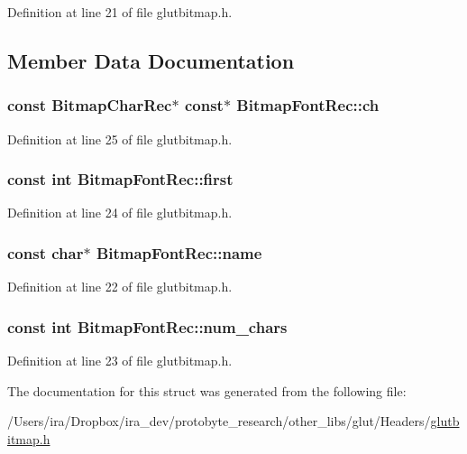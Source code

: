Definition at line 21 of file glutbitmap.\-h.



\subsection{Member Data Documentation}
\hypertarget{struct_bitmap_font_rec_a5dc1989a9be5be061a6fe71affff15be}{
\subsubsection[{ch}]{\setlength{\rightskip}{0pt plus 5cm}const {\bf Bitmap\-Char\-Rec}$\ast$ const$\ast$ Bitmap\-Font\-Rec\-::ch}}\label{struct_bitmap_font_rec_a5dc1989a9be5be061a6fe71affff15be}


Definition at line 25 of file glutbitmap.\-h.

\hypertarget{struct_bitmap_font_rec_ae3fa065bd6cb89438656029968f38a37}{
\subsubsection[{first}]{\setlength{\rightskip}{0pt plus 5cm}const int Bitmap\-Font\-Rec\-::first}}\label{struct_bitmap_font_rec_ae3fa065bd6cb89438656029968f38a37}


Definition at line 24 of file glutbitmap.\-h.

\hypertarget{struct_bitmap_font_rec_ad70b2bdb7beb381ac3e6aaab7742a6cf}{
\subsubsection[{name}]{\setlength{\rightskip}{0pt plus 5cm}const char$\ast$ Bitmap\-Font\-Rec\-::name}}\label{struct_bitmap_font_rec_ad70b2bdb7beb381ac3e6aaab7742a6cf}


Definition at line 22 of file glutbitmap.\-h.

\hypertarget{struct_bitmap_font_rec_a02dcce32386981a7860d7eb63e610a6f}{
\subsubsection[{num\-\_\-chars}]{\setlength{\rightskip}{0pt plus 5cm}const int Bitmap\-Font\-Rec\-::num\-\_\-chars}}\label{struct_bitmap_font_rec_a02dcce32386981a7860d7eb63e610a6f}


Definition at line 23 of file glutbitmap.\-h.



The documentation for this struct was generated from the following file\-:\begin{DoxyCompactItemize}
\item 
/\-Users/ira/\-Dropbox/ira\-\_\-dev/protobyte\-\_\-research/other\-\_\-libs/glut/\-Headers/\hyperlink{glutbitmap_8h}{glutbitmap.\-h}\end{DoxyCompactItemize}
